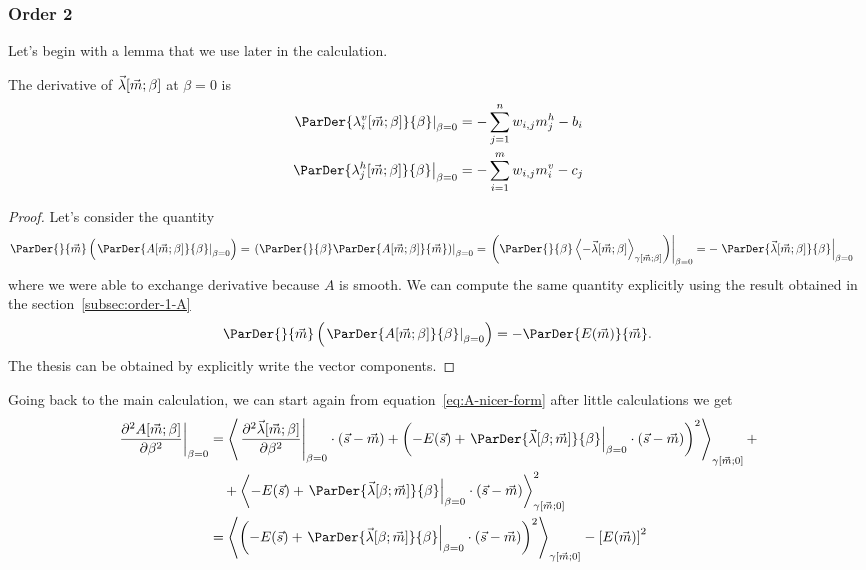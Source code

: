 \subsubsection{Order 2}
Let's begin with a lemma that we use later in the calculation.
\begin{lemma} \label{lem:first-derivative-lambda}
  The derivative of \(\vec{\lambda}{\left[\vec{m};\beta\right]}\) at \(\beta = 0\) is
  \begin{align*}
    \left.\ParDer{\lvim{\beta}}{\beta}\right|_{\beta=0} &= -\sum_{j=1}^n w_{i,j}m^h_j-b_i\\
    \left.\ParDer{\lhjm{\beta}}{\beta}\right|_{\beta=0} &= -\sum_{i=1}^m w_{i,j}m^v_i-c_j
  \end{align*}
  \begin{proof}
    Let's consider the quantity
    \begin{align*}
      \ParDer{}{\vec{m}}\left(\left.\ParDer{A{\left[\vec{m};\beta\right]}}{\beta}\right|_{\beta=0}\right)
      &= \left.\left(\ParDer{}{\beta}\ParDer{A{\left[\vec{m};\beta\right]}}{\vec{m}}\right)\right|_{\beta=0}
      = \left.\left(\ParDer{}{\beta}\Gmean{-\Lambd{\vec{m}}{\beta}}{\vec{m}}{\beta}\right)\right|_{\beta=0}
      = -\left.\ParDer{\Lambd{\vec{m}}{\beta}}{\beta}\right|_{\beta=0}
    \end{align*}
    where we were able to exchange derivative because \(A\) is smooth.
    We can compute the same quantity explicitly using the result obtained in the
    section~\ref{subsec:order-1-A}
    \[
      \ParDer{}{\vec{m}}\left(\left.\ParDer{A{\left[\vec{m};\beta\right]}}{\beta}\right|_{\beta=0}\right)
      = -\ParDer{E{(\vec{m})}}{\vec{m}}.
    \]
    The thesis can be obtained by explicitly write the vector components.
  \end{proof}
\end{lemma}
Going back to the main calculation, we can start again from equation~\eqref{eq:A-nicer-form} after little calculations we get
\begin{align*}
  \left.\frac{\partial^2A{\left[\vec{m};\beta\right]}}{\partial\beta^2}\right|_{\beta=0}
  &= \Gmean{
       \left.\frac{\partial^2\vec{\lambda}{\left[\vec{m};\beta\right]}}{\partial\beta^2}\right|_{\beta=0}
         \cdot (\vec{s}-\vec{m})
       +\left(-E{(\vec{s})} +   
          \left.\ParDer{\Lambd{\beta}{\vec{m}}}{\beta}\right|_{\beta=0}\cdot(\vec{s}-\vec{m})\right)^2
     }{\vec{m}}{0}+\\
  &\quad+ \Gmean{
          -E{(\vec{s})}+\left.\ParDer{\Lambd{\beta}{\vec{m}}}{\beta}\right|_{\beta=0}\cdot(\vec{s}-\vec{m})
       }{\vec{m}}{0}^2 \\
  &= \Gmean{
       \left(-E{(\vec{s})} +   
        \left.\ParDer{\Lambd{\beta}{\vec{m}}}{\beta}\right|_{\beta=0}\cdot(\vec{s}-\vec{m})\right)^2
     }{\vec{m}}{0} - \left[E{(\vec{m})}\right]^2
\end{align*}
